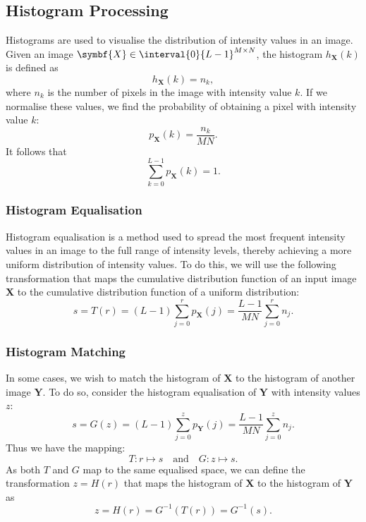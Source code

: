 \documentclass{article}
\begin{document}
\subsection{Histogram Processing}
Histograms are used to visualise the distribution of intensity values
in an image. Given an image \(\symbf{X} \in \interval{0}{L-1}^{M \times
N}\), the histogram \(h_{\symbf{X}}\left( k \right)\) is defined as
\begin{equation*}
    h_{\symbf{X}}\left( k \right) = n_k,
\end{equation*}
where \(n_k\) is the number of pixels in the image with intensity value
\(k\). If we normalise these values, we find the probability of
obtaining a pixel with intensity value \(k\):
\begin{equation*}
    p_{\symbf{X}}\left( k \right) = \frac{n_k}{MN}.
\end{equation*}
It follows that
\begin{equation*}
    \sum_{k=0}^{L-1} p_{\symbf{X}}\left( k \right) = 1.
\end{equation*}
\subsubsection{Histogram Equalisation}
Histogram equalisation is a method used to spread the most frequent
intensity values in an image to the full range of intensity levels,
thereby achieving a more uniform distribution of intensity values. To
do this, we will use the following transformation that maps the
cumulative distribution function of an input image \(\symbf{X}\) to the
cumulative distribution function of a uniform distribution:
\begin{equation*}
    s = T\left( r \right) = \left( L - 1 \right) \sum_{j=0}^{r} p_{\symbf{X}}\left( j \right) = \frac{L - 1}{MN} \sum_{j=0}^{r} n_j.
\end{equation*}
\subsubsection{Histogram Matching}
In some cases, we wish to match the histogram of \(\symbf{X}\) to the
histogram of another image \(\symbf{Y}\). To do so, consider the
histogram equalisation of \(\symbf{Y}\) with intensity values \(z\):
\begin{equation*}
    s = G\left( z \right) = \left( L - 1 \right) \sum_{j=0}^{z} p_{\symbf{Y}}\left( j \right) = \frac{L - 1}{MN} \sum_{j=0}^{z} n_j.
\end{equation*}
Thus we have the mapping:
\begin{equation*}
    T: r \mapsto s \quad \text{and} \quad G: z \mapsto s.
\end{equation*}
As both \(T\) and \(G\) map to the same equalised space, we can define
the transformation \(z = H\left( r \right)\) that maps the histogram of
\(\symbf{X}\) to the histogram of \(\symbf{Y}\) as
\begin{equation*}
    z = H\left( r \right) = G^{-1}\left( T\left( r \right) \right) = G^{-1}\left( s \right).
\end{equation*}
\end{document}
